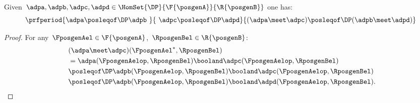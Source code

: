 \begin{lemma}
    \label{lem:intersection_mon}
    Given~$\adpa,\adpb,\adpc,\adpd \in \HomSet{\DP}{\F{\posgenA}}{\R{\posgenB}}$ one has:
    \begin{equation*}
        \prfperiod{\adpa\posleqof\DP \adpb\ }{\ \adpc\posleqof\DP \adpd}{(\adpa\meet \adpc)\posleqof\DP (\adpb\meet \adpd)}
    \end{equation*}
\end{lemma}
\begin{proof}
    For any~$\FposgenAel\in \F{\posgenA}$,~$\RposgenBel\in \R{\posgenB}$:
    \begin{equation*}
        \begin{aligned}
           ~& (\adpa \meet \adpc)(\FposgenAel^*,\RposgenBel) \\
             & =\adpa(\FposgenAelop,\RposgenBel)\booland \adpc(\FposgenAelop,\RposgenBel)              \\
             & \posleqof\DP \adpb(\FposgenAelop,\RposgenBel)\booland \adpc(\FposgenAelop,\RposgenBel)  \\
             & \posleqof\DP \adpb(\FposgenAelop,\RposgenBel)\booland \adpd(\FposgenAelop,\RposgenBel).
        \end{aligned}
    \end{equation*}
\end{proof}
